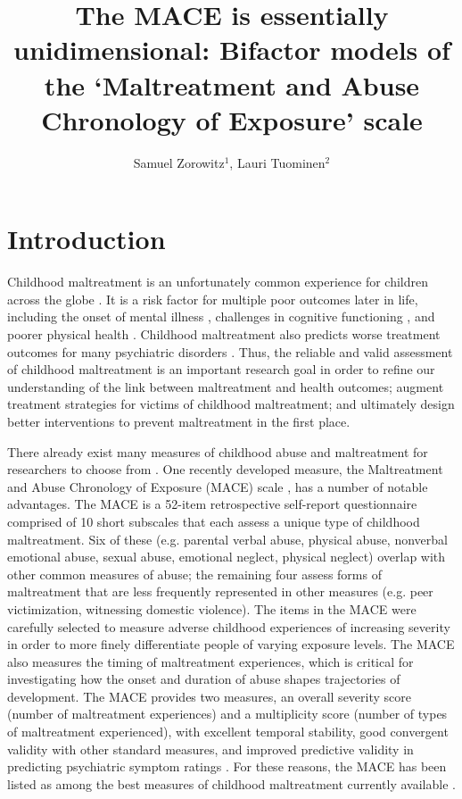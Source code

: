\documentclass[letterpaper,man,natbib,floatsintext,longtable]{apa6}
\title{The MACE is essentially unidimensional: Bifactor models of the `Maltreatment and Abuse Chronology of Exposure' scale}
\author{Samuel Zorowitz$^1$, Lauri Tuominen$^{2}$}
\affiliation{$^1$Princeton Neuroscience Institute, Princeton University, USA\\$^2$The Royal’s Institute of Mental Health Research, University of Ottawa, Canada}
\begin{document}
\maketitle

\section{Introduction}

Childhood maltreatment is an unfortunately common experience for children across the globe \citep{stoltenborgh2015prevalence}. It is a risk factor for multiple poor outcomes later in life, including the onset of mental illness \citep{macmillan2001childhood, green2010childhood, kessler2010childhood}, challenges in cognitive functioning \citep{kavanaugh2017neurocognitive, r2018common, su2019does}, and poorer physical health \citep{wegman2009meta, widom2012prospective, goodwin2004association}. Childhood maltreatment also predicts worse treatment outcomes for many psychiatric disorders \citep{nanni2012childhood, thomas2019childhood, schuckher2019history}. Thus, the reliable and valid assessment of childhood maltreatment is an important research goal in order to refine our understanding of the link between maltreatment and health outcomes; augment treatment strategies for victims of childhood maltreatment; and ultimately design better interventions to prevent maltreatment in the first place. 

There already exist many measures of childhood abuse and maltreatment for researchers to choose from \citep{saini2019systematic}. One recently developed measure, the Maltreatment and Abuse Chronology of Exposure (MACE) scale \citep{teicher2015maltreatment}, has a number of notable advantages. The MACE is a 52-item retrospective self-report questionnaire comprised of 10 short subscales that each assess a unique type of childhood maltreatment. Six of these (e.g. parental verbal abuse, physical abuse, nonverbal emotional abuse, sexual abuse, emotional neglect, physical neglect) overlap with other common measures of abuse; the remaining four assess forms of maltreatment that are less frequently represented in other measures (e.g. peer victimization, witnessing domestic violence). The items in the MACE were carefully selected to measure adverse childhood experiences of increasing severity in order to more finely differentiate people of varying exposure levels. The MACE also measures the timing of maltreatment experiences, which is critical for investigating how the onset and duration of abuse shapes trajectories of development. The MACE provides two measures, an overall severity score (number of maltreatment experiences) and a multiplicity score (number of types of maltreatment experienced), with excellent temporal stability, good convergent validity with other standard measures, and improved predictive validity in predicting psychiatric symptom ratings \citep{teicher2015maltreatment}. For these reasons, the MACE has been listed as among the best measures of childhood maltreatment currently available \citep{saini2019systematic, georgieva2022systematic}.
\end{document}
